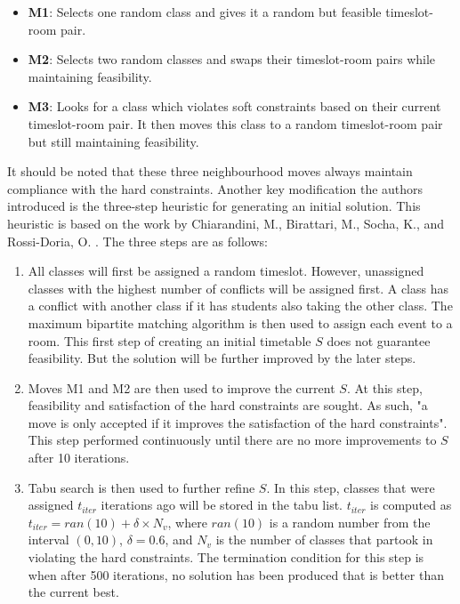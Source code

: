 \begin{itemize}
	\item \textbf{M1}: Selects one random class and gives it a random but feasible timeslot-room pair.
	\item \textbf{M2}: Selects two random classes and swaps their timeslot-room pairs while maintaining feasibility.
	\item \textbf{M3}: Looks for a class which violates soft constraints based on their current timeslot-room pair. It then moves this class to a random timeslot-room pair but still maintaining feasibility.
\end{itemize}

It should be noted that these three neighbourhood moves always maintain compliance with the hard constraints. Another key modification the authors introduced is the three-step heuristic for generating an initial solution. This heuristic is based on the work by Chiarandini, M., Birattari, M., Socha, K., and Rossi-Doria, O. \cite{chiarandini-effective-hybrid}. The three steps are as follows:

\begin{enumerate}
	\item All classes will first be assigned a random timeslot. However, unassigned classes with the highest number of conflicts will be assigned first. A class has a conflict with another class if it has students also taking the other class. The maximum bipartite matching algorithm \cite{maximum-bipartite-matching} is then used to assign each event to a room. This first step of creating an initial timetable $S$ does not guarantee feasibility. But the solution will be further improved by the later steps.
	\item Moves M1 and M2 are then used to improve the current $S$. At this step, feasibility and satisfaction of the hard constraints are sought. As such, "a move is only accepted if it improves the satisfaction of the hard constraints". This step performed continuously until there are no more improvements to $S$ after 10 iterations.
	\item Tabu search \cite{brownlee-tabu-search} is then used to further refine $S$. In this step, classes that were assigned $t_{iter}$ iterations ago will be stored in the tabu list. $t_{iter}$ is computed as $t_{iter} = ran(10) + \delta \times N_{v}$, where $ran(10)$ is a random number from the interval $(0, 10)$, $\delta = 0.6$, and $N_{v}$ is the number of classes that partook in violating the hard constraints. The termination condition for this step is when after 500 iterations, no solution has been produced that is better than the current best.
\end{enumerate}

